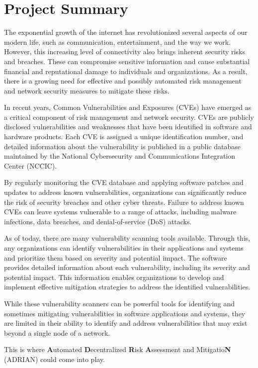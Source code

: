 \section{Project Summary}

The exponential growth of the internet has revolutionized several aspects of our modern life, such as communication, entertainment, and the way we work. However, this increasing level of connectivity also brings inherent security risks and breaches. These can compromise sensitive information and cause substantial financial and reputational damage to individuals and organizations. As a result, there is a growing need for effective and possibly automated risk management and network security measures to mitigate these risks.


In recent years, Common Vulnerabilities and Exposures (CVEs) have emerged as a critical component of risk management and network security. CVEs are publicly disclosed vulnerabilities and weaknesses that have been identified in software and hardware products. Each CVE is assigned a unique identification number, and detailed information about the vulnerability is published in a public database maintained by the National Cybersecurity and Communications Integration Center (NCCIC).

By regularly monitoring the CVE database and applying software patches and updates to address known vulnerabilities, organizations can significantly reduce the risk of security breaches and other cyber threats. Failure to address known CVEs can leave systems vulnerable to a range of attacks, including malware infections, data breaches, and denial-of-service (DoS) attacks.

As of today, there are many vulnerability scanning tools available. Through this, any organizations can identify vulnerabilities in their applications and systems and prioritize them based on severity and potential impact. The software provides detailed information about each vulnerability, including its severity and potential impact. This information enables organizations to develop and implement effective mitigation strategies to address the identified vulnerabilities.

While these vulnerability scanners can be powerful tools for identifying and sometimes mitigating vulnerabilities in software applications and systems, they are limited in their ability to identify and address vulnerabilities that may exist beyond a single node of a network.

This is where \textbf{A}utomated \textbf{D}ecentralized \textbf{R}isk \textbf{A}ssessment and Mitigatio\textbf{N} (ADRIAN) could come into play. 
